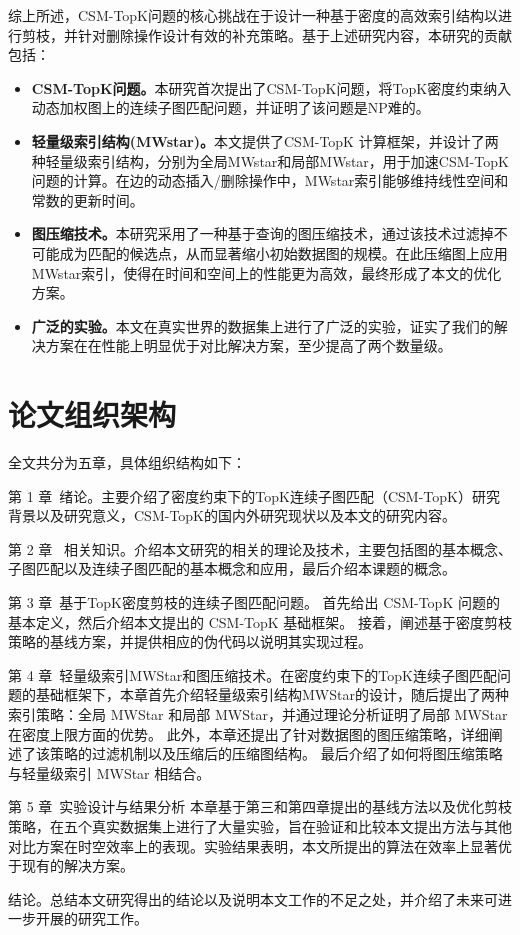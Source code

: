    综上所述，CSM-TopK问题的核心挑战在于设计一种基于密度的高效索引结构以进行剪枝，并针对删除操作设计有效的补充策略。基于上述研究内容，本研究的贡献包括：
\begin{itemize}[label={\textbullet}]
    \item \textbf{CSM-TopK问题。}本研究首次提出了CSM-TopK问题，将TopK密度约束纳入动态加权图上的连续子图匹配问题，并证明了该问题是NP难的。
    \item \textbf{轻量级索引结构(MWstar)。}本文提供了CSM-TopK 计算框架，并设计了两种轻量级索引结构，分别为全局MWstar和局部MWstar，用于加速CSM-TopK问题的计算。在边的动态插入/删除操作中，MWstar索引能够维持线性空间和常数的更新时间。
    \item \textbf{图压缩技术。}本研究采用了一种基于查询的图压缩技术，通过该技术过滤掉不可能成为匹配的候选点，从而显著缩小初始数据图的规模。在此压缩图上应用 MWstar索引，使得在时间和空间上的性能更为高效，最终形成了本文的优化方案。
    \item \textbf{广泛的实验。}本文在真实世界的数据集上进行了广泛的实验，证实了我们的解决方案在在性能上明显优于对比解决方案，至少提高了两个数量级。
  \end{itemize}
\section{论文组织架构}
全文共分为五章，具体组织结构如下：

第 1 章\ 绪论。主要介绍了密度约束下的TopK连续子图匹配（CSM-TopK）研究背景以及研究意义，CSM-TopK的国内外研究现状以及本文的研究内容。

第 2 章 \ 相关知识。介绍本文研究的相关的理论及技术，主要包括图的基本概念、子图匹配以及连续子图匹配的基本概念和应用，最后介绍本课题的概念。

第 3 章\ 基于TopK密度剪枝的连续子图匹配问题。
首先给出 CSM-TopK 问题的基本定义，然后介绍本文提出的 CSM-TopK 基础框架。
接着，阐述基于密度剪枝策略的基线方案，并提供相应的伪代码以说明其实现过程。

第 4 章\ 轻量级索引MWStar和图压缩技术。在密度约束下的TopK连续子图匹配问题的基础框架下，本章首先介绍轻量级索引结构MWStar的设计，随后提出了两种索引策略：全局 MWStar 和局部 MWStar，并通过理论分析证明了局部 MWStar 在密度上限方面的优势。
此外，本章还提出了针对数据图的图压缩策略，详细阐述了该策略的过滤机制以及压缩后的压缩图结构。
最后介绍了如何将图压缩策略与轻量级索引 MWStar 相结合。

第 5 章\ 实验设计与结果分析
本章基于第三和第四章提出的基线方法以及优化剪枝策略，在五个真实数据集上进行了大量实验，旨在验证和比较本文提出方法与其他对比方案在时空效率上的表现。实验结果表明，本文所提出的算法在效率上显著优于现有的解决方案。

结论。总结本文研究得出的结论以及说明本文工作的不足之处，并介绍了未来可进一步开展的研究工作。
